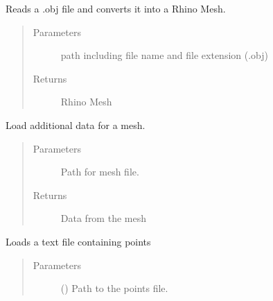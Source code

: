 \documentclass[letterpaper,10pt,english]{sphinxmanual}
\begin{document}

\begin{fulllineitems}
\label{\detokenize{lib:livestock.lib.geometry.import_obj}}
Reads a .obj file and converts it into a Rhino Mesh.
\begin{quote}\begin{description}
\item[{Parameters}] \leavevmode
{} \textendash{} path including file name and file extension (.obj)

\item[{Returns}] \leavevmode
Rhino Mesh

\end{description}\end{quote}

\end{fulllineitems}


\begin{fulllineitems}
\label{\detokenize{lib:livestock.lib.geometry.load_mesh_data}}
Load additional data for a mesh.
\begin{quote}\begin{description}
\item[{Parameters}] \leavevmode
{} \textendash{} Path for mesh file.

\item[{Returns}] \leavevmode
Data from the mesh

\end{description}\end{quote}

\end{fulllineitems}


\begin{fulllineitems}
\label{\detokenize{lib:livestock.lib.geometry.load_points}}
Loads a text file containing points
\begin{quote}\begin{description}
\item[{Parameters}] \leavevmode
{} () \textendash{} Path to the points file.

\end{description}\end{quote}

\end{fulllineitems}
\end{document}
